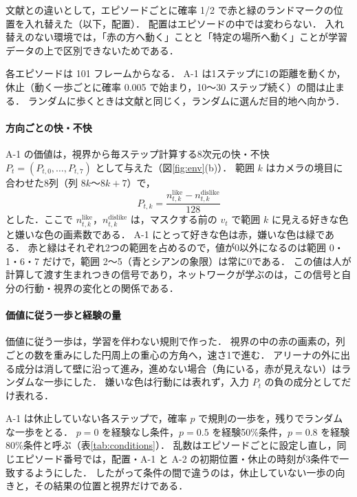 文献\cite{noguchi2022superposition}との違いとして，エピソードごとに確率 1/2 で赤と緑のランドマークの位置を入れ替えた（以下，配置）．
配置はエピソードの中では変わらない．
入れ替えのない環境では，「赤の方へ動く」ことと「特定の場所へ動く」ことが学習データの上で区別できないためである．

各エピソードは 101 フレームからなる．
A-1 は1ステップに1の距離を動くか，休止（動く一歩ごとに確率 0.005 で始まり，10〜30 ステップ続く）の間は止まる．
ランダムに歩くときは文献\cite{noguchi2022superposition}と同じく，ランダムに選んだ目的地へ向かう．

\paragraph{方向ごとの快・不快}
A-1 の価値は，視界から毎ステップ計算する8次元の快・不快 $P_t=(P_{t,0},\dots,P_{t,7})$ として与えた（図\ref{fig:env}(b)）．
範囲 $k$ はカメラの境目に合わせた8列（列 $8k$〜$8k{+}7$）で，
\begin{equation}
  P_{t,k} = \frac{n^{\mathrm{like}}_{t,k} - n^{\mathrm{dislike}}_{t,k}}{128}
\end{equation}
とした．ここで $n^{\mathrm{like}}_{t,k}$，$n^{\mathrm{dislike}}_{t,k}$ は，マスクする前の $v_t$ で範囲 $k$ に見える好きな色と嫌いな色の画素数である．
A-1 にとって好きな色は赤，嫌いな色は緑である．
赤と緑はそれぞれ2つの範囲を占めるので，値が0以外になるのは範囲 0・1・6・7 だけで，範囲 2〜5（青とシアンの象限）は常に0である．
この値は人が計算して渡す生まれつきの信号であり，ネットワークが学ぶのは，この信号と自分の行動・視界の変化との関係である．

\paragraph{価値に従う一歩と経験の量}
価値に従う一歩は，学習を伴わない規則で作った．
視界の中の赤の画素の，列ごとの数を重みにした円周上の重心の方角へ，速さ1で進む．
アリーナの外に出る成分は消して壁に沿って進み，進めない場合（角にいる，赤が見えない）はランダムな一歩にした．
嫌いな色は行動には表れず，入力 $P_t$ の負の成分としてだけ表れる．

A-1 は休止していない各ステップで，確率 $p$ で規則の一歩を，残りでランダムな一歩をとる．
$p=0$ を経験なし条件，$p=0.5$ を経験50\%条件，$p=0.8$ を経験80\%条件と呼ぶ（表\ref{tab:conditions}）．
乱数はエピソードごとに設定し直し，同じエピソード番号では，配置・A-1 と A-2 の初期位置・休止の時刻が3条件で一致するようにした．
したがって条件の間で違うのは，休止していない一歩の向きと，その結果の位置と視界だけである．

